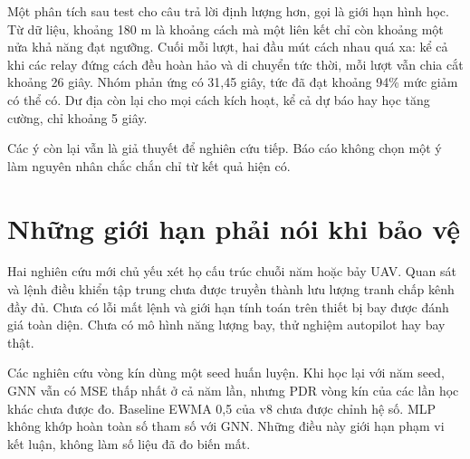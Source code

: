 Một phân tích sau test cho câu trả lời định lượng hơn, gọi là giới hạn hình học. Từ dữ liệu, khoảng 180 m là khoảng cách mà một liên kết chỉ còn khoảng một nửa khả năng đạt ngưỡng. Cuối mỗi lượt, hai đầu mút cách nhau quá xa: kể cả khi các relay đứng cách đều hoàn hảo và di chuyển tức thời, mỗi lượt vẫn chia cắt khoảng 26 giây. Nhóm phản ứng có 31,45 giây, tức đã đạt khoảng 94\% mức giảm có thể có. Dư địa còn lại cho mọi cách kích hoạt, kể cả dự báo hay học tăng cường, chỉ khoảng 5 giây.

Các ý còn lại vẫn là giả thuyết để nghiên cứu tiếp. Báo cáo không chọn một ý làm nguyên nhân chắc chắn chỉ từ kết quả hiện có.

\section{Những giới hạn phải nói khi bảo vệ}
Hai nghiên cứu mới chủ yếu xét họ cấu trúc chuỗi năm hoặc bảy UAV. Quan sát và lệnh điều khiển tập trung chưa được truyền thành lưu lượng tranh chấp kênh đầy đủ. Chưa có lỗi mất lệnh và giới hạn tính toán trên thiết bị bay được đánh giá toàn diện. Chưa có mô hình năng lượng bay, thử nghiệm autopilot hay bay thật.

Các nghiên cứu vòng kín dùng một seed huấn luyện. Khi học lại với năm seed, GNN vẫn có MSE thấp nhất ở cả năm lần, nhưng PDR vòng kín của các lần học khác chưa được đo. Baseline EWMA 0,5 của v8 chưa được chỉnh hệ số. MLP không khớp hoàn toàn số tham số với GNN. Những điều này giới hạn phạm vi kết luận, không làm số liệu đã đo biến mất.


